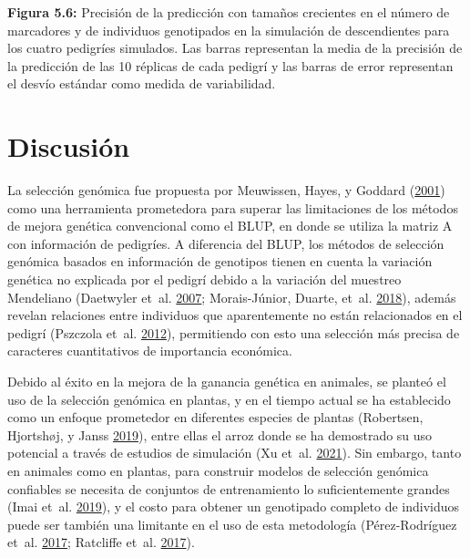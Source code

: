 \documentclass[11pt,spanish,a4paper,oneside,]{book} %
\begin{document}
\noindent
\textbf{Figura 5.6:} Precisión de la predicción con tamaños crecientes en el número de marcadores y de individuos genotipados en la simulación de descendientes para los cuatro pedigríes simulados. Las barras representan la media de la precisión de la predicción de las 10 réplicas de cada pedigrí y las barras de error representan el desvío estándar como medida de variabilidad.

\clearpage\null\thispagestyle{empty}

\hypertarget{discusiuxf3n}{%
\chapter{Discusión}\label{discusiuxf3n}}

La selección genómica fue propuesta por Meuwissen, Hayes, y Goddard (\protect\hyperlink{ref-cite:8}{2001}) como una herramienta prometedora para superar las limitaciones de los métodos de mejora genética convencional como el BLUP, en donde se utiliza la matriz A con información de pedigríes. A diferencia del BLUP, los métodos de selección genómica basados en información de genotipos tienen en cuenta la variación genética no explicada por el pedigrí debido a la variación del muestreo Mendeliano (Daetwyler et~al. \protect\hyperlink{ref-cite:40}{2007}; Morais-Júnior, Duarte, et~al. \protect\hyperlink{ref-cite:69}{2018}), además revelan relaciones entre individuos que aparentemente no están relacionados en el pedigrí (Pszczola et~al. \protect\hyperlink{ref-cite:74}{2012}), permitiendo con esto una selección más precisa de caracteres cuantitativos de importancia económica.

Debido al éxito en la mejora de la ganancia genética en animales, se planteó el uso de la selección genómica en plantas, y en el tiempo actual se ha establecido como un enfoque prometedor en diferentes especies de plantas (Robertsen, Hjortshøj, y Janss \protect\hyperlink{ref-cite:63}{2019}), entre ellas el arroz donde se ha demostrado su uso potencial a través de estudios de simulación (Xu et~al. \protect\hyperlink{ref-cite:60}{2021}). Sin embargo, tanto en animales como en plantas, para construir modelos de selección genómica confiables se necesita de conjuntos de entrenamiento lo suficientemente grandes (Imai et~al. \protect\hyperlink{ref-cite:20}{2019}), y el costo para obtener un genotipado completo de individuos puede ser también una limitante en el uso de esta metodología (Pérez-Rodríguez et~al. \protect\hyperlink{ref-cite:19}{2017}; Ratcliffe et~al. \protect\hyperlink{ref-cite:72}{2017}).
\end{document}
